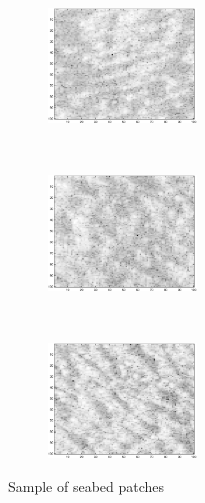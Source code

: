 \documentclass[a4paper,11pt]{report}
\begin{document}
		\begin{figure}[t!]
			\centering
			\begin{subfigure}[t]{0.5\textwidth}
				\centering
				\includegraphics[height=1.2in]{patch_seabed.eps}
			\end{subfigure}%
			~ 
			\begin{subfigure}[t]{0.5\textwidth}
        \centering
        \includegraphics[height=1.2in]{patch_seabed_2.eps}
			\end{subfigure}
			~
			\begin{subfigure}[t]{0.5\textwidth}
        \centering
        \includegraphics[height=1.2in]{patch_seabed_3.eps}
			\end{subfigure}
			\caption{Sample of seabed patches}
			\label{fig:Seabed patch}
		\end{figure}
		
\end{document}

